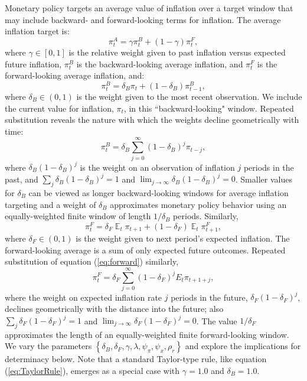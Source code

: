\documentclass[english,authoryear,12pt]{elsarticle}
\DeclareMathOperator{\E}{\mathbb{E}}
\begin{document}
Monetary policy targets an average value of inflation over a target window that may include backward- and forward-looking terms for inflation. The average inflation target is:
\begin{equation}
	\pi_t^A = \gamma \pi_t^B + (1-\gamma) \pi_t^F,
\end{equation}
where $\gamma \in [0,1]$ is the relative weight given to past inflation versus expected future inflation, $\pi_t^B$ is the backward-looking average inflation, and $\pi_t^F$ is the forward-looking average inflation, and:
\begin{equation}\label{eq:backward}
	\pi_t^B = \delta_B \pi_t + (1-\delta_B) \pi_{t-1}^B,
\end{equation}
where $\delta_B \in (0,1)$ is the weight given to the most recent observation. We include the current value for inflation, $\pi_t$, in this ``backward-looking" window.  Repeated substitution reveals the nature with which the weights decline geometrically with time:
\begin{equation}\label{eq:backward_all}
	\pi_t^B = \delta_B \sum_{j=0}^{\infty} (1-\delta_B)^j \pi_{t-j},
\end{equation}
where $\delta_B (1-\delta_B)^j$ is the weight on an observation of inflation $j$ periods in the past, and $\sum_j \delta_B (1-\delta_B)^j=1$ and $\lim_{j \to \infty} \delta_B (1-\delta_B)^j=0$. Smaller values for $\delta_B$ can be viewed as longer backward-looking windows for average inflation targeting and a weight of $\delta_B$ approximates monetary policy behavior using an equally-weighted finite window of length $1 / \delta_B$ periods. Similarly,
\begin{equation}\label{eq:forward}
	\pi_t^F = \delta_F \E_t \pi_{t+1} + (1-\delta_F) \E_t \pi_{t+1}^F,
\end{equation}
where $\delta_F \in (0,1)$ is the weight given to next period's expected inflation. The forward-looking average is a sum of only expected future outcomes. Repeated substitution of equation (\ref{eq:forward}) similarly,
\begin{equation}\label{eq:forward_all}
	\pi_t^F = \delta_F \sum_{j=0}^{\infty} (1-\delta_F)^j E_t \pi_{t+1+j},
\end{equation}
where the weight on expected inflation rate $j$ periods in the future, $\delta_F (1-\delta_F)^{j}$, declines geometrically with the distance into the future; also $\sum_j \delta_F (1-\delta_F)^{j}=1$ and $\lim_{j \to \infty} \delta_F (1-\delta_F)^j=0$. The value $1/ \delta_F$ approximates the length of an equally-weighted finite forward-looking window. We vary the parameters $\left\{\delta_B, \delta_F, \gamma, \lambda, \psi_\pi, \psi_x, \rho_r \right\}$ and explore the implications for determinacy below. Note that a standard Taylor-type rule, like equation (\ref{eq:TaylorRule}), emerges as a special case with $\gamma=1.0$ and $\delta_B=1.0$.
\end{document}
